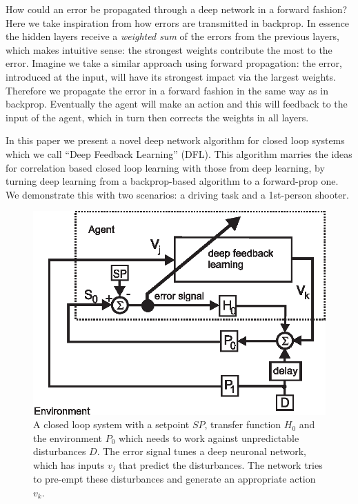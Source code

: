 \documentclass{aamas2018}
\begin{document}
How could an error be propagated through a deep network in a forward
fashion? Here we take inspiration from how errors are transmitted in
backprop. In essence the hidden layers receive a \textsl{weighted sum}
of the errors from the previous layers, which makes intuitive sense:
the strongest weights contribute the most to the error. Imagine we
take a similar approach using forward propagation: the error,
introduced at the input, will have its strongest impact via the
largest weights. Therefore we propagate the error in a forward fashion
in the same way as in backprop. Eventually the agent will make an
action and this will feedback to the input of the agent, which in turn
then corrects the weights in all layers.

In this paper we present a novel deep network algorithm for closed
loop systems which we call ``Deep Feedback Learning'' (DFL). This
algorithm marries the ideas for correlation based closed loop learning
with those from deep learning, by turning deep learning from a
backprop-based algorithm to a forward-prop one. We demonstrate this
with two scenarios: a driving task and a 1st-person shooter.

\begin{figure}[!ht]
  \centering
  \includegraphics[width=0.75\columnwidth]{closed_loop}
  \caption{A closed loop system with a setpoint $SP$, transfer function $H_0$ and the
    environment $P_0$ which needs to work against unpredictable disturbances $D$.
    The error signal tunes a deep neuronal network, which has inputs
    $v_j$ that predict the disturbances. The network tries to pre-empt these
    disturbances and generate an appropriate action $v_k$.
    \label{closed_loop}}
\end{figure}
\end{document}

